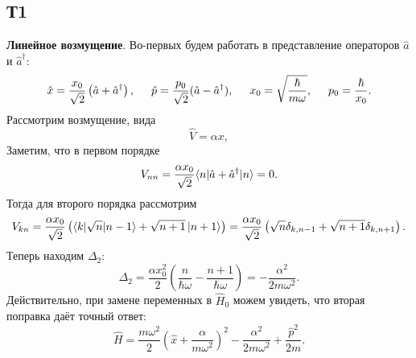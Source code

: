 \subsection*{Т1}


\textbf{Линейное возмущение}.
Во-первых будем работать в представление операторов $\hat{a}$ и $\hat{a}^\dag$:
\begin{equation*}
        \hat{x} = \frac{x_0}{\sqrt{2}}\left(\hat{a} + \hat{a}^\dag\right),
        \hspace{5 mm} 
        \hat{p} = \frac{p_0}{\sqrt{2}} (\hat{a} - \hat{a}^\dag),
        \hspace{5 mm} 
        x_0 = \sqrt{\frac{\hbar}{m \omega}},
        \hspace{5 mm} 
        p_0 = \frac{\hbar}{x_0}.
\end{equation*}
Рассмотрим возмущение, вида
\begin{equation*}
    \hat{V} = \alpha x,
\end{equation*}
Заметим, что в первом порядке
\begin{equation*}
    V_{nn} =  \frac{\alpha x_0}{\sqrt{2}} \bk{n}[\hat{a} + \hat{a}^\dag]{n} = 0.
\end{equation*}
Тогда для второго порядка рассмотрим
\begin{equation*}
    V_{kn} = \frac{\alpha x_0}{\sqrt{2}}  \left(\bk{k}[\sqrt{n}]{n-1}
        + \sqrt{n+1} \ket{n+1}
    \right) = \frac{\alpha x_0}{\sqrt{2}} \left(
        \sqrt{n} \delta_{k,n-1} + \sqrt{n+1} \delta_{k, n+1}
    \right).
\end{equation*}
Теперь находим $\Delta_2$:
\begin{equation*}
    \Delta_2 = \frac{\alpha x_0^2}{2} \left(
        \frac{n}{\hbar \omega} - \frac{n+1}{\hbar \omega}
    \right) = - \frac{\alpha^2}{2 m \omega^2}.
\end{equation*}
Действительно, при замене переменных в $\hat{H}_0$ можем увидеть, что вторая поправка даёт точный ответ:
\begin{equation*}
    \hat{H} = \frac{m \omega^2}{2} \left(\hat{x} + \frac{\alpha}{m \omega^2}\right)^2 - \frac{\alpha^2}{2 m \omega^2} + \frac{\hat{p}^2}{2m}.
\end{equation*}


